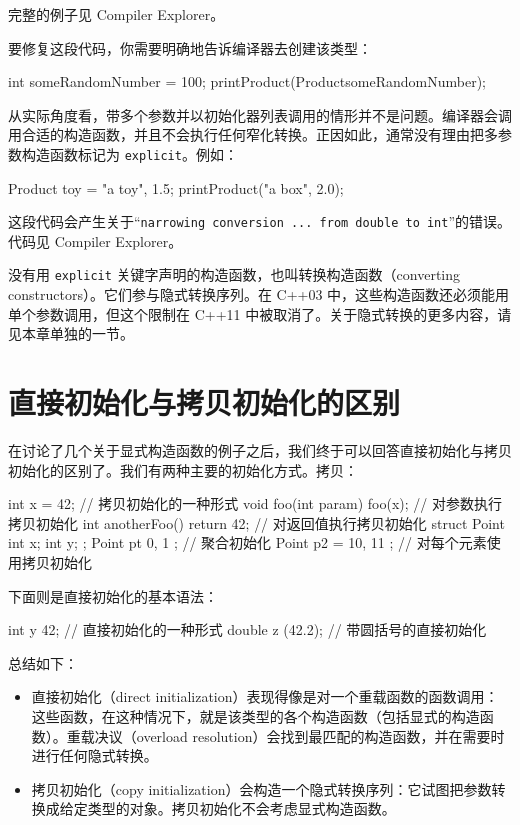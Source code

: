 完整的例子见 Compiler Explorer。

要修复这段代码，你需要明确地告诉编译器去创建该类型：

\begin{codebox}[cpp]
int someRandomNumber = 100;
printProduct(Product{someRandomNumber});
\end{codebox}

从实际角度看，带多个参数并以初始化器列表调用的情形并不是问题。编译器会调用合适的构造函数，并且不会执行任何窄化转换。正因如此，通常没有理由把多参数构造函数标记为 \texttt{explicit}。例如：

\begin{codebox}[cpp]
Product toy = {"a toy", 1.5};
printProduct({"a box", 2.0});
\end{codebox}

这段代码会产生关于“\texttt{narrowing conversion ... from double to int}”的错误。代码见 Compiler Explorer。

\begin{myInfoBox}
没有用 \texttt{explicit} 关键字声明的构造函数，也叫转换构造函数（converting constructors）。它们参与隐式转换序列。在 C++03 中，这些构造函数还必须能用单个参数调用，但这个限制在 C++11 中被取消了。关于隐式转换的更多内容，请见本章单独的一节。
\end{myInfoBox}


\section{直接初始化与拷贝初始化的区别}

在讨论了几个关于显式构造函数的例子之后，我们终于可以回答直接初始化与拷贝初始化的区别了。我们有两种主要的初始化方式。拷贝：

\begin{codebox}[cpp]
int x = 42;
// 拷贝初始化的一种形式
void foo(int param) { }
foo(x);
// 对参数执行拷贝初始化
int anotherFoo() { return 42; }
// 对返回值执行拷贝初始化
struct Point { int x; int y; };
Point pt { 0, 1 };
// 聚合初始化
Point p2 = { 10, 11 };
// 对每个元素使用拷贝初始化
\end{codebox}

下面则是直接初始化的基本语法：

\begin{codebox}[cpp]
int y {42};
// 直接初始化的一种形式
double z (42.2);
// 带圆括号的直接初始化
\end{codebox}

总结如下：

\begin{itemize}
\item 直接初始化（direct initialization）表现得像是对一个重载函数的函数调用：这些函数，在这种情况下，就是该类型的各个构造函数（包括显式的构造函数）。重载决议（overload resolution）会找到最匹配的构造函数，并在需要时进行任何隐式转换。
\item 拷贝初始化（copy initialization）会构造一个隐式转换序列：它试图把参数转换成给定类型的对象。拷贝初始化不会考虑显式构造函数。
\end{itemize}

